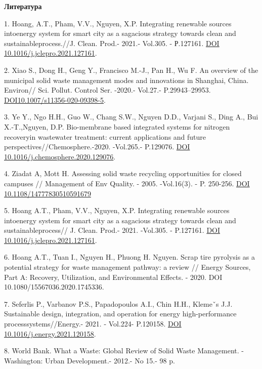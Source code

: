 \begin{center}
{\bfseries Литература}
\end{center}

\begin{references}
1. Hoang, A.T., Pham, V.V., Nguyen, X.P. Integrating renewable sources
intoenergy system for smart city as a sagacious strategy towards clean
and sustainableprocess.//J. Clean. Prod.- 2021.- Vol.305. - Р.127161.
\href{https://doi.org/10.1016/j.jclepro.2021.127161}{DOI
10.1016/j.jclepro.2021.127161}.

2. Xiao S., Dong H., Geng Y., Francisco M.-J., Pan H., Wu F. An overview
of the municipal solid waste management modes and innovations in
Shanghai, China. Environ// Sci. Pollut. Control Ser. -2020.- Vol.27.-
P.29943--29953.
\href{https://doi.org/10.1007/s11356-020-09398-5}{DOI10.1007/s11356-020-09398-5}.

3. Ye Y., Ngo H.H., Guo W., Chang S.W., Nguyen D.D., Varjani S., Ding
A., Bui X.-T.,Nguyen, D.P. Bio-membrane based integrated systems for
nitrogen recoveryin wastewater treatment: current applications and
future perspectives//Chemosphere.-2020. -Vol.265.- P.129076.
\href{https://doi.org/10.1016/j.chemosphere.2020.129076}{DOI
10.1016/j.chemosphere.2020.129076}.

4. Ziadat A, Mott H. Assessing solid waste recycling opportunities for
closed campuses // Management of Env Quality. - 2005. -Vol.16(3). - P.
250-256. \href{https://doi.org/10.1108/14777830510591679}{DOI
10.1108/14777830510591679}

5. Hoang A.T., Pham, V.V., Nguyen, X.P. Integrating renewable sources
intoenergy system for smart city as a sagacious strategy towards clean
and sustainableprocess// J. Clean. Prod.- 2021. -Vol.305. - P.127161.
\href{https://doi.org/\%2010.1016/j.jclepro.2021.127161}{DOI
10.1016/j.jclepro.2021.127161}.

6. Hoang A.T., Tuan I., Nguyen H., Phuong H. Nguyen. Scrap tire
pyrolysis as a potential strategy for waste management pathway: a review
// Energy Sources, Part A: Recovery, Utilization, and Environmental
Effects. - 2020. DOI 10.1080/15567036.2020.1745336.

7. Seferlis P., Varbanov P.S., Papadopoulos A.I., Chin H.H., Klemeˇs
J.J. Sustainable design, integration, and operation for energy
high-performance processsystems//Energy.- 2021. - Vol.224- P.120158.
\href{https://doi.org/10.1016/j.energy.2021.120158}{DOI
10.1016/j.energy.2021.120158}.

8. World Bank. What a Waste: Global Review of Solid Waste Management.
-Washington: Urban Develop\-ment.- 2012.- No 15.- 98 p.


\end{references}
